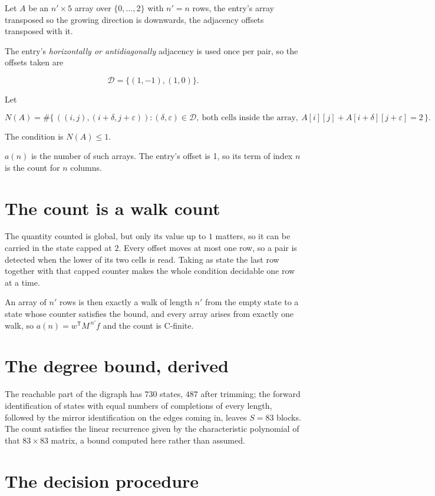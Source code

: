 \documentclass[11pt]{article}
\theoremstyle{definition}
\begin{document}
Let $A$ be an $n' \times 5$ array over $\{0,\dots,2\}$ with $n' = n$ rows, the entry's array transposed so the growing direction is downwards, the adjacency offsets transposed with it.

The entry's {\itshape horizontally or antidiagonally} adjacency is used once per pair, so the offsets taken are

\[\mathcal{D} = \{(1,-1), (1,0)\}.\]

Let

\[N(A) = \#\bigl\{\,((i,j),(i{+}\delta,j{+}\varepsilon)) : (\delta,\varepsilon) \in \mathcal{D},\ \text{both cells inside the array},\ A[i][j] + A[i{+}\delta][j{+}\varepsilon] = 2\,\bigr\}.\]

The condition is $N(A) \le 1$.

$a(n)$ is the number of such arrays. The entry's offset is 1, so its term of index $n$ is the count for $n$ columns.

\section{The count is a walk count}

The quantity counted is global, but only its value up to $1$ matters, so it can be carried in the state capped at $2$. Every offset moves at most one row, so a pair is detected when the lower of its two cells is read. Taking as state the last row together with that capped counter makes the whole condition decidable one row at a time.

An array of $n'$ rows is then exactly a walk of length $n'$ from the empty state to a state whose counter satisfies the bound, and every array arises from exactly one walk, so $a(n) = w^{\mathsf T}M^{\,n'}f$ and the count is C-finite.

\section{The degree bound, derived}

The reachable part of the digraph has $730$ states, $487$ after trimming; the forward identification of states with equal numbers of completions of every length, followed by the mirror identification on the edges coming in, leaves $S = 83$ blocks. The count satisfies the linear recurrence given by the characteristic polynomial of that $83\times83$ matrix, a bound computed here rather than assumed.

\section{The decision procedure}
\end{document}
